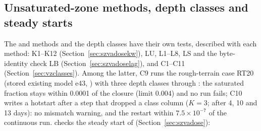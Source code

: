 \subsection{Unsaturated-zone methods, depth classes and steady starts}\label{sec:vszmethods}
The  and  methods and the depth classes have their own tests, described with each method:
 K1--K12 (Section~\ref{sec:szvadosekw}),  LU, L1--L8, LS and the byte-identity
check LB (Section~\ref{sec:szvadoselag}), and  C1--C11 (Section~\ref{sec:vzclasses}). Among the
latter, C9 runs the rough-terrain case RT20 (stored existing model e43, ) with three depth classes through
: the saturated fraction stays within 0.0001 of the closure (limit 0.004) and no run fails; C10
writes a hotstart after a step that dropped a class column ($K=3$; after 4, 10 and 13 days): no mismatch warning, and the
restart within $7.5\times10^{-7}$ of the continuous run.  checks the steady start of
 (Section~\ref{sec:szvadose}):
